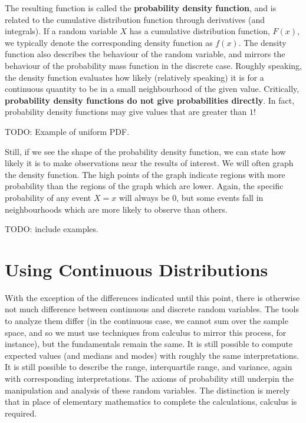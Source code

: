\documentclass[
  letterpaper,
  DIV=11,
  numbers=noendperiod]{scrreprt}
\begin{document}
The resulting function is called the \textbf{probability density
function}, and is related to the cumulative distribution function
through derivatives (and integrals). If a random variable \(X\) has a
cumulative distribution function, \(F(x)\), we typically denote the
corresponding density function as \(f(x)\). The density function also
describes the behaviour of the random variable, and mirrors the
behaviour of the probability mass function in the discrete case. Roughly
speaking, the density function evaluates how likely (relatively
speaking) it is for a continuous quantity to be in a small neighbourhood
of the given value. Critically, \textbf{probability density functions do
not give probabilities directly}. In fact, probability density functions
may give values that are greater than \(1\)!

TODO: Example of uniform PDF.

Still, if we see the shape of the probability density function, we can
state how likely it is to make observations near the results of
interest. We will often graph the density function. The high points of
the graph indicate regions with more probability than the regions of the
graph which are lower. Again, the specific probability of any event
\(X=x\) will always be \(0\), but some events fall in neighbourhoods
which are more likely to observe than others.

TODO: include examples.

\section{Using Continuous
Distributions}\label{using-continuous-distributions}

With the exception of the differences indicated until this point, there
is otherwise not much difference between continuous and discrete random
variables. The tools to analyze them differ (in the continuous case, we
cannot sum over the sample space, and so we must use techniques from
calculus to mirror this process, for instance), but the fundamentals
remain the same. It is still possible to compute expected values (and
medians and modes) with roughly the same interpretations. It is still
possible to describe the range, interquartile range, and variance, again
with corresponding interpretations. The axioms of probability still
underpin the manipulation and analysis of these random variables. The
distinction is merely that in place of elementary mathematics to
complete the calculations, calculus is required.
\end{document}
